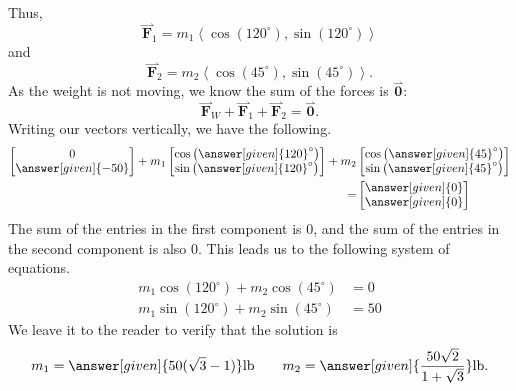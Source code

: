 \documentclass{ximera}
\begin{document}
\begin{example}
\begin{explanation}
\begin{image}
  \end{image}
    Thus,
    \[
    \overset{\rightharpoonup}{\mathbf{F}}_1 = m_1\left\langle \cos(120^\circ),\sin(120^\circ) \right\rangle
    \]
    and
    \[
    \overset{\rightharpoonup}{\mathbf{F}}_2 = m_2\left\langle \cos(45^\circ),\sin(45^\circ) \right\rangle.
    \]
    As the weight is not moving, we know the sum of the forces is
    $\overset{\rightharpoonup}{\mathbf{0}}$:
    \[
    \overset{\rightharpoonup}{\mathbf{F}}_W + \overset{\rightharpoonup}{\mathbf{F}}_1 + \overset{\rightharpoonup}{\mathbf{F}}_2 = \overset{\rightharpoonup}{\mathbf{0}}.
    \]
    Writing our vectors vertically, we have the following.
    \begin{align*}
      \begin{bmatrix}
        0\\
        \answer[given]{-50}
      \end{bmatrix}
      +m_1
      \begin{bmatrix}
        \cos\left({\answer[given]{120}}^\circ\right)\\
        \sin\left({\answer[given]{120}}^\circ\right)
      \end{bmatrix}
      + m_2
      &\begin{bmatrix}
      \cos\left({\answer[given]{45}}^\circ\right)\\
      \sin\left({\answer[given]{45}}^\circ\right)
      \end{bmatrix}\\
      =
      &\begin{bmatrix}
        \answer[given]{0}\\
        \answer[given]{0}
      \end{bmatrix}
    \end{align*}
    The sum of the entries in the first component is 0, and the sum of
    the entries in the second component is also 0. This leads us to
    the following system of equations.
    \begin{align*}
      m_1\cos(120^\circ) + m_2\cos(45^\circ) &=0 \\
      m_1\sin(120^\circ) + m_2\sin(45^\circ) &=50
    \end{align*}
    We leave it to the reader to verify that the solution is
    \[
    m_1=\answer[given]{50(\sqrt{3}-1)}\mathrm{lb} \qquad m_2=\answer[given]{\frac{50\sqrt{2}}{1+\sqrt{3}}}\mathrm{lb}.
    \]
  \end{explanation}
\end{example}
\end{document}
